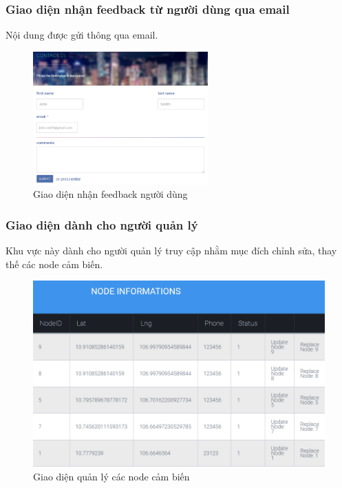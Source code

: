 \subsubsection*{Giao diện nhận feedback từ người dùng qua email}
Nội dung được gửi thông qua email.
	\begin{figure}[H]
		\centering    
		\includegraphics[width=0.6\textwidth]{web_email}
		\caption[Giao diện nhận feedback người dùng]{Giao diện nhận feedback người dùng}
		\label{fig:web_email}
	\end{figure}

\subsubsection*{Giao diện dành cho người quản lý}
Khu vực này dành cho người quản lý truy cập nhằm mục đích chỉnh sửa, thay thế các node cảm biến.
	\begin{figure}[H]
		\centering    
		\includegraphics[width=1\textwidth]{web_nodeinfo}
		\caption[Giao diện quản lý các node cảm biến]{Giao diện quản lý các node cảm biến}
		\label{fig:web_nodeinfo}
	\end{figure}
	
